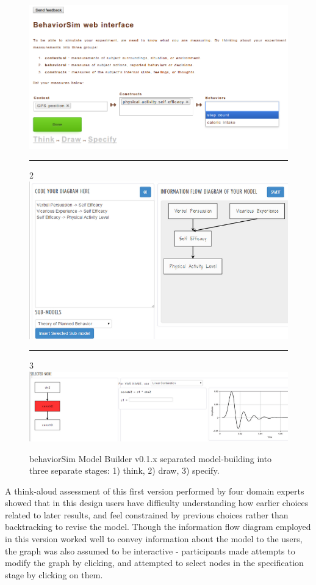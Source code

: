 \documentclass[conference]{IEEEtran}
\begin{document}
\begin{figure}[!t]
  \includegraphics[width=0.9\columnwidth]{img/v1-think}
  \rule{\columnwidth}{0.4pt}
  2
  \includegraphics[width=0.9\columnwidth]{img/v1-draw}
  \rule{\columnwidth}{0.4pt}
  3
  \includegraphics[width=0.9\columnwidth]{img/v1-specify}  
  \caption{behaviorSim Model Builder v0.1.x separated model-building into three separate stages: 1) think, 2) draw, 3) specify.}
  \label{model-builder-v1}
\end{figure}

A think-aloud assessment of this first version performed by four domain experts showed that in this design users have difficulty understanding how earlier choices related to later results, and feel constrained by previous choices rather than backtracking to revise the model.
Though the information flow diagram employed in this version worked well to convey information about the model to the users, the graph was also assumed to be interactive - participants made attempts to modify the graph by clicking, and attempted to select nodes in the specification stage by clicking on them.
\end{document}

